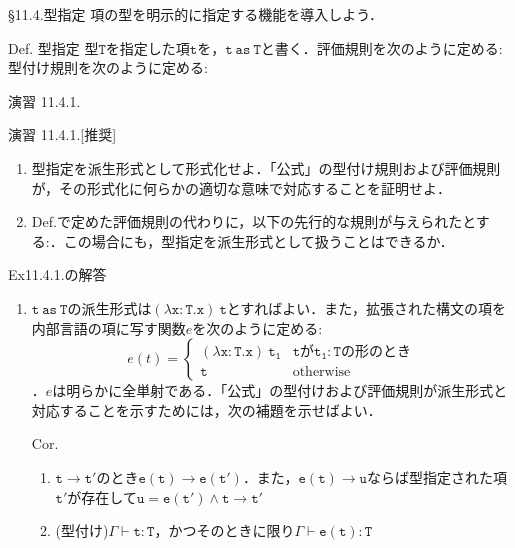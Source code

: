 \documentclass[9pt]{beamer}
\begin{document}
\begin{frame}{\S11.4.型指定}
項の型を明示的に指定する機能を導入しよう．\begin{alertblock}{Def. 型指定}
型$\mathtt{T}$を指定した項$\mathtt{t}$を，$\mathtt{t\ as\ T}$と書く．評価規則を次のように定める:
型付け規則を次のように定める:
\end{alertblock}
\end{frame}
\begin{frame}{演習 11.4.1.}
\begin{alertblock}{演習 11.4.1.[推奨]}
\begin{enumerate}
\item 型指定を派生形式として形式化せよ．「公式」の型付け規則および評価規則が，その形式化に何らかの適切な意味で対応することを証明せよ．
\item Def.で定めた評価規則の代わりに，以下の先行的な規則が与えられたとする:．この場合にも，型指定を派生形式として扱うことはできるか．
\end{enumerate}
\end{alertblock}
\end{frame}
\begin{frame}{Ex11.4.1.の解答}
\begin{enumerate}
  \item $\mathtt{t\ as\ T}$の派生形式は$\mathtt{(\lambda x:T.x)\ t}$とすればよい．また，拡張された構文の項を内部言語の項に写す関数$e$を次のように定める:
\begin{equation*}e(t) = \begin{cases}
\mathtt{(\lambda x:T. x)\ t_{1}}& \text{$\mathtt{t}$が$\mathtt{t_{1}:T}$の形のとき} \\
\mathtt{t} & \text{otherwise}
\end{cases}\end{equation*}．$e$は明らかに全単射である．「公式」の型付けおよび評価規則が派生形式と対応することを示すためには，次の補題を示せばよい．
\begin{alertblock}{Cor.}\begin{enumerate}
\item $\mathtt{t\longrightarrow t'}$のとき$\mathtt{e(t)\longrightarrow e(t')}$．また，$\mathtt{e(t)\longrightarrow u}$ならば型指定された項$\mathtt{t'}$が存在して$\mathtt{u = e(t')\land t\longrightarrow t'}$
\item (型付け)$\Gamma\vdash\mathtt{t:T}$，かつそのときに限り$\Gamma\vdash \mathtt{e(t):T}$
\end{enumerate}
\end{alertblock}
\end{enumerate}
\end{frame}
\end{document}
